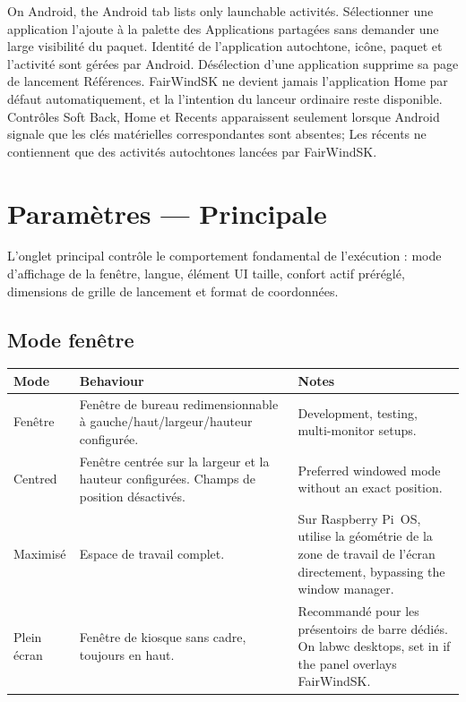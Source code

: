 On Android, the Android tab lists only launchable 
activités. Sélectionner une application l'ajoute à la palette des Applications partagées sans
demander une large visibilité du paquet. Identité de l'application autochtone, icône, paquet et
l'activité sont gérées par Android. Désélection d'une application supprime sa page de lancement
Références. FairWindSK ne devient jamais l'application Home par défaut automatiquement, et la
l'intention du lanceur ordinaire reste disponible. Contrôles Soft Back, Home et Recents
apparaissent seulement lorsque Android signale que les clés matérielles correspondantes sont absentes;
Les récents ne contiennent que des activités autochtones lancées par FairWindSK.

\chapter{Paramètres --- Principale}
\label{ch:settings-main}

L'onglet principal contrôle le comportement fondamental de l'exécution : mode d'affichage de la fenêtre, langue, élément UI
taille, confort actif préréglé, dimensions de grille de lancement et format de coordonnées.


\section{Mode fenêtre}

\begin{longtable}{L{2.4cm}L{5.6cm}L{5.7cm}}
\toprule
{}
\color{white}\sffamily\bfseries Mode &
\color{white}\sffamily\bfseries Behaviour &
\color{white}\sffamily\bfseries Notes \\
\midrule
Fenêtre&Fenêtre de bureau redimensionnable à gauche/haut/largeur/hauteur configurée.&
  Development, testing, multi-monitor setups. \\
Centred&Fenêtre centrée sur la largeur et la hauteur configurées. Champs de position désactivés.&
  Preferred windowed mode without an exact position. \\
Maximisé&Espace de travail complet.&
Sur Raspberry Pi~OS, utilise la géométrie de la zone de travail de l'écran directement,
  bypassing the window manager. \\
Plein écran&Fenêtre de kiosque sans cadre, toujours en haut.&
Recommandé pour les présentoirs de barre dédiés.
  On labwc desktops, set 
  in  if the panel overlays FairWindSK. \\
\bottomrule
\end{longtable}

